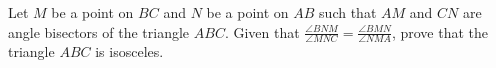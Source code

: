 Let $ M$ be a point on $ BC$ and $ N$ be a point on $ AB$ such that $ AM$ and $ CN$ are angle bisectors of the triangle $ ABC$. Given that $ \frac {\angle BNM}{\angle MNC} = \frac {\angle BMN}{\angle NMA}$,  prove that the triangle $ ABC$ is isosceles.